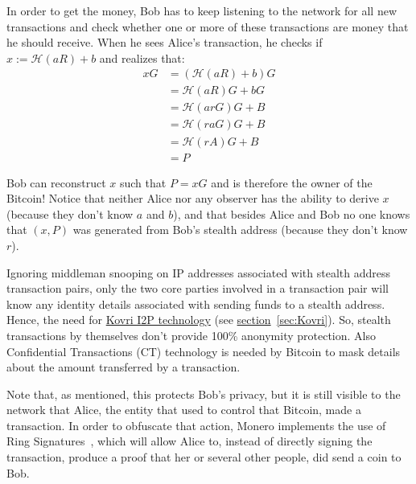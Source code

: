 In order to get the money, Bob has to keep listening to the network for all new transactions and check whether one or more of these transactions are money that he should receive. When he sees Alice's transaction, he checks if $x := \mathcal{H}(aR)+b$ and realizes that:
\begin{align*} \label{eq:checkstealth}
  xG &= (\mathcal{H}(aR)+b)G \\
     &= \mathcal{H}(aR)G+bG \\
     &= \mathcal{H}(arG)G+B \\
     &= \mathcal{H}(raG)G+B \\
     &= \mathcal{H}(rA)G+B \\
     &= P
\end{align*}
\pagebreak

Bob can reconstruct $x$ such that $P = xG$ and is therefore the owner of the Bitcoin! Notice that neither Alice nor any observer has the ability to derive $x$ (because they don't know $a$ and $b$), and that besides Alice and Bob no one knows that $(x,P)$ was generated from Bob's stealth address (because they don't know $r$).

Ignoring middleman snooping on IP addresses associated with stealth address transaction pairs, only the two core parties involved in a transaction pair will know any identity details associated with sending funds to a stealth address. Hence, the need for \hyperref[sec:Kovri]{Kovri I2P technology} (see \hyperref[sec:Kovri]{section}~\ref{sec:Kovri}). So, stealth transactions by themselves don't provide 100\% anonymity protection. Also Confidential Transactions (CT) technology is needed by Bitcoin to mask details about the amount transferred by a transaction.

Note that, as mentioned, this protects Bob's privacy, but it is still visible to the network that Alice, the entity that used to control that Bitcoin, made a transaction. In order to obfuscate that action, Monero implements the use of Ring Signatures~\cite{ringCT}, which will allow Alice to, instead of directly signing the transaction, produce a proof that her or several other people, did send a coin to Bob.

